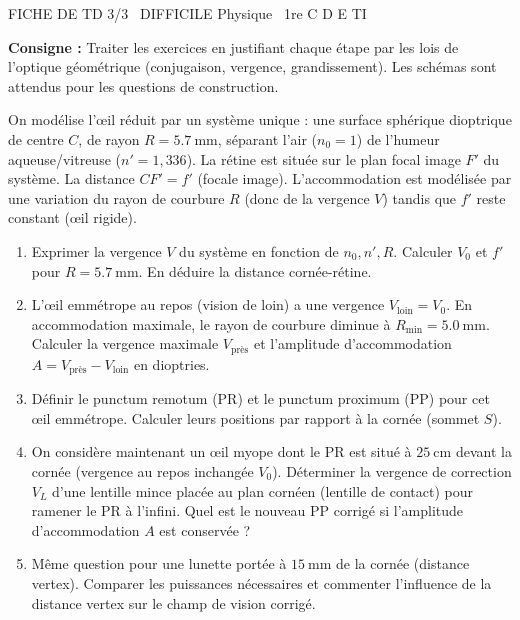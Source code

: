 \documentclass[11pt]{article}
\begin{document}
\begin{tcolorbox}[enhanced,colback=popink,colframe=popink,arc=10pt,boxrule=0pt,left=12pt,right=12pt,top=9pt,bottom=9pt]
{\color{white}\popxbold\small FICHE DE TD 3/3 \textbullet\ DIFFICILE \hfill Physique \textbullet\ 1re C D E TI\par}
\end{tcolorbox}
\vspace{4pt}
\noindent \textbf{Consigne :} Traiter les exercices en justifiant chaque étape par les lois de l'optique géométrique (conjugaison, vergence, grandissement). Les schémas sont attendus pour les questions de construction.

\begin{exercice}
On modélise l'œil réduit par un système unique : une surface sphérique dioptrique de centre $C$, de rayon $R = \SI{5,7}{\milli\meter}$, séparant l'air ($n_0 = 1$) de l'humeur aqueuse/vitreuse ($n' = 1,336$). La rétine est située sur le plan focal image $F'$ du système. La distance $CF' = f'$ (focale image). L'accommodation est modélisée par une variation du rayon de courbure $R$ (donc de la vergence $V$) tandis que $f'$ reste constant (œil rigide).
\begin{enumerate}
    \item Exprimer la vergence $V$ du système en fonction de $n_0, n', R$. Calculer $V_0$ et $f'$ pour $R = \SI{5,7}{\milli\meter}$. En déduire la distance cornée-rétine.
    \item L'œil emmétrope au repos (vision de loin) a une vergence $V_{\text{loin}} = V_0$. En accommodation maximale, le rayon de courbure diminue à $R_{\text{min}} = \SI{5,0}{\milli\meter}$. Calculer la vergence maximale $V_{\text{près}}$ et l'amplitude d'accommodation $A = V_{\text{près}} - V_{\text{loin}}$ en dioptries.
    \item Définir le punctum remotum (PR) et le punctum proximum (PP) pour cet œil emmétrope. Calculer leurs positions par rapport à la cornée (sommet $S$).
    \item On considère maintenant un œil myope dont le PR est situé à $\SI{25}{\centi\meter}$ devant la cornée (vergence au repos inchangée $V_0$). Déterminer la vergence de correction $V_L$ d'une lentille mince placée au plan cornéen (lentille de contact) pour ramener le PR à l'infini. Quel est le nouveau PP corrigé si l'amplitude d'accommodation $A$ est conservée ?
    \item Même question pour une lunette portée à $\SI{15}{\milli\meter}$ de la cornée (distance vertex). Comparer les puissances nécessaires et commenter l'influence de la distance vertex sur le champ de vision corrigé.
\end{enumerate}
\end{exercice}
\end{document}
